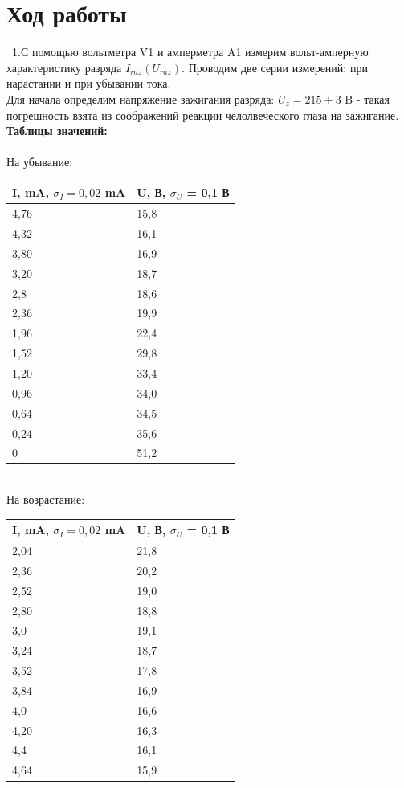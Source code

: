 \documentclass[11pt]{article}
\begin{document}
\section*{Ход работы}\
1.С помощью вольтметра V1 и амперметра A1 измерим вольт-амперную характеристику разряда $I_{raz}(U_{raz})$. Проводим две серии измерений: при нарастании и при убывании тока.\\
Для начала определим напряжение зажигания разряда: $U_{z}= 215 \pm 3$ B - такая погрешность взята из соображений реакции челолвеческого глаза на зажигание.\\

\textbf{Таблицы значений:}\\
\ \\
На убывание:\\
\begin{tabular}{|l|l|}
\hline
I, mA, $\sigma_I=0,02$ mA & U, В, $\sigma_U$ = 0,1 В\\
\hline
4,76 & 15,8
\\
\hline
4,32 & 16,1
\\
\hline
3,80 & 16,9
\\
\hline
3,20 & 18,7
\\
\hline
2,8 & 18,6
\\
\hline
2,36 & 19,9
\\
\hline
1,96 & 22,4
\\
\hline 
1,52 & 29,8
\\
\hline
1,20 & 33,4
\\
\hline
0,96 & 34,0
\\
\hline
0,64 & 34,5
\\
\hline
0,24 & 35,6
\\
\hline
0 & 51,2
\\
\hline
\end{tabular}
\ \\
На возрастание:\\
\begin{tabular}{|l|l|}
\hline
I, mA, $\sigma_I=0,02$ mA & U, В, $\sigma_U$ = 0,1 В\\
\hline
2,04 & 21,8
\\
\hline
2,36 & 20,2
\\
\hline
2,52 & 19,0
\\
\hline
2,80 & 18,8
\\
\hline
3,0 & 19,1
\\
\hline
3,24 & 18,7
\\
\hline
3,52 & 17,8
\\
\hline 
3,84 & 16,9
\\
\hline
4,0 & 16,6
\\
\hline
4,20 & 16,3
\\
\hline
4,4 & 16,1
\\
\hline
4,64 & 15,9
\\
\hline

\end{tabular}
\end{document}
